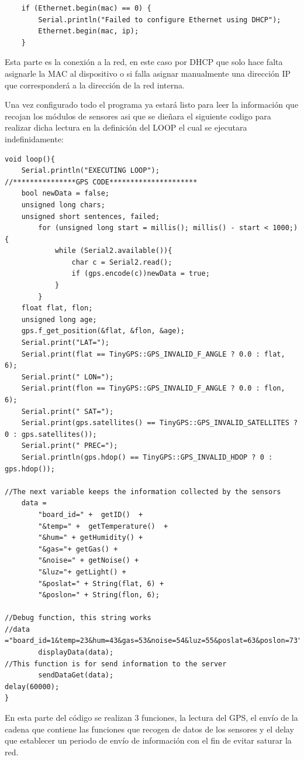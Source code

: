 \begin{lstlisting}
	if (Ethernet.begin(mac) == 0) {
		Serial.println("Failed to configure Ethernet using DHCP");
		Ethernet.begin(mac, ip);
	}
\end{lstlisting}
Esta parte es la conexión a la red, en este caso por DHCP que solo hace falta asignarle la MAC al dispositivo o si falla asignar manualmente una dirección IP que corresponderá a la dirección de la red interna.

Una vez configurado todo el programa ya estará listo para leer la información que recojan los módulos de sensores asi que se dieñara el siguiente codigo para realizar dicha lectura en la definición del LOOP el cual se ejecutara indefinidamente:\\

\begin{lstlisting}
void loop(){
	Serial.println("EXECUTING LOOP");
//***************GPS CODE*********************
	bool newData = false;
	unsigned long chars;
	unsigned short sentences, failed;
		for (unsigned long start = millis(); millis() - start < 1000;){
			while (Serial2.available()){
				char c = Serial2.read();
				if (gps.encode(c))newData = true;
			}
		}
	float flat, flon;
	unsigned long age;
	gps.f_get_position(&flat, &flon, &age);
	Serial.print("LAT=");
	Serial.print(flat == TinyGPS::GPS_INVALID_F_ANGLE ? 0.0 : flat, 6);
	Serial.print(" LON=");
	Serial.print(flon == TinyGPS::GPS_INVALID_F_ANGLE ? 0.0 : flon, 6);
	Serial.print(" SAT=");
	Serial.print(gps.satellites() == TinyGPS::GPS_INVALID_SATELLITES ? 0 : gps.satellites());
	Serial.print(" PREC=");
	Serial.println(gps.hdop() == TinyGPS::GPS_INVALID_HDOP ? 0 : gps.hdop());

//The next variable keeps the information collected by the sensors
	data = 
		"board_id=" +  getID()  +
		"&temp=" +  getTemperature()  + 
		"&hum=" + getHumidity() +
		"&gas="+ getGas() + 
		"&noise=" + getNoise() +
		"&luz="+ getLight() + 
		"&poslat=" + String(flat, 6) + 
		"&poslon=" + String(flon, 6);

//Debug function, this string works
//data ="board_id=1&temp=23&hum=43&gas=53&noise=54&luz=55&poslat=63&poslon=73";
		displayData(data);
//This function is for send information to the server
		sendDataGet(data);
delay(60000);
}
\end{lstlisting}

En esta parte del código se realizan 3 funciones, la lectura del GPS, el envío de la cadena que contiene las funciones que recogen de datos de los sensores y el delay que establecer un periodo de envío de información con el fin de evitar saturar la red.\\

